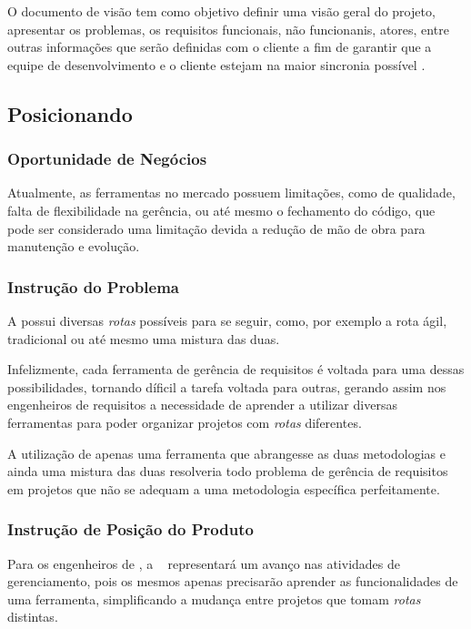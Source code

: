 
O documento de visão tem como objetivo definir uma visão geral do projeto, apresentar os problemas, os requisitos funcionais, não funcionanis, atores, entre outras informações que serão definidas com o cliente a fim de garantir que a equipe de desenvolvimento e o cliente estejam na maior sincronia possível \cite{IBM:2014:Online}.

\subsection{Posicionando}
\subsubsection{Oportunidade de Negócios}

Atualmente, as ferramentas no mercado possuem limitações, como de qualidade, falta de flexibilidade na gerência, ou até mesmo o fechamento do código, que pode ser considerado uma limitação devida a redução de mão de obra para manutenção e evolução.

\subsubsection{Instrução do Problema}

A \er{} possui diversas \textit{rotas} possíveis para se seguir, como, por exemplo a rota ágil, tradicional ou até mesmo uma mistura das duas.

Infelizmente, cada ferramenta de gerência de requisitos é voltada para uma dessas possibilidades, tornando díficil a tarefa voltada para outras, gerando assim nos engenheiros de requisitos a necessidade de aprender a utilizar diversas ferramentas para poder organizar projetos com \textit{rotas} diferentes.

A utilização de apenas uma ferramenta que abrangesse as duas metodologias e ainda uma mistura das duas resolveria todo problema de gerência de requisitos em projetos que não se adequam a uma metodologia específica perfeitamente.

\subsubsection{Instrução de Posição do Produto}

Para os engenheiros de \er, a \nomeferramenta~ representará um avanço nas atividades de gerenciamento, pois os mesmos apenas precisarão aprender as funcionalidades de uma ferramenta, simplificando a mudança entre projetos que tomam \textit{rotas} distintas.

